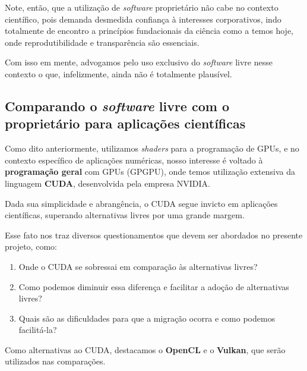 \documentclass[10pt, conference]{IEEEtran}
\begin{document}
Note, então, que a utilização de \textit{software} proprietário não cabe no
contexto científico, pois demanda desmedida confiança à interesses corporativos,
indo totalmente de encontro a princípios fundacionais da ciência como a temos
hoje, onde reprodutibilidade e transparência são essenciais.

Com isso em mente, advogamos pelo uso exclusivo do \textit{software} livre nesse
contexto o que, infelizmente, ainda não é totalmente plausível.

\subsection{Comparando o \textit{software} livre com o proprietário para aplicações científicas}

Como dito anteriormente, utilizamos \textit{shaders} para a programação de GPUs,
e no contexto específico de aplicações numéricas, nosso interesse é voltado à
\textbf{programação geral} com GPUs (GPGPU), onde temos utilização extensiva
da linguagem \textbf{CUDA}, desenvolvida pela empresa NVIDIA.

Dada sua simplicidade e abrangência, o CUDA segue invicto em aplicações
científicas, superando alternativas livres por uma grande margem.


Esse fato nos traz diversos questionamentos que devem ser abordados no presente
projeto, como:

\begin{enumerate}
    \item Onde o CUDA se sobressai em comparação às alternativas livres?
    \item Como podemos diminuir essa diferença e facilitar a adoção de alternativas livres?
    \item Quais são as dificuldades para que a migração ocorra e como podemos facilitá-la?
\end{enumerate}

Como alternativas ao CUDA, destacamos o \textbf{OpenCL} e o \textbf{Vulkan},
que serão utilizados nas comparações.

\end{document}
